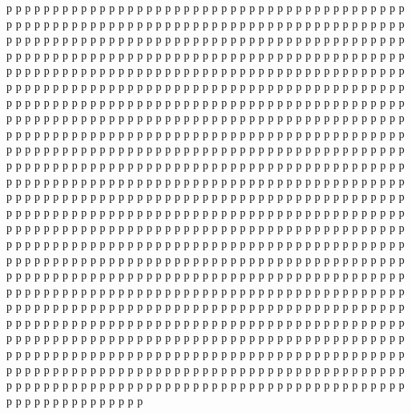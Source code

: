 \documentclass[a4paper,12pt]{article}
\begin{document}
\large
р р р р р р р р р р р р р р р р р р р р р р р р р р р р р р р р р р р р р р р р р р р р р р р р р р р р р р р р р р р р р р р р р р р р р р р р р р р р р р р р р р р р р р р р р р р р р р р р р р р р р р р р р р р р р р р р р р р р р р р р р р р р р р р р р р р р р р р р р р р р р р р р р р р р р р р р р р р р р р р р р р р р р р р р р р р р р р р р р р р р р р р р р р р р р р р р р р р р р р р р р р р р р р р р р р р р р р р р р р р р р р р р р р р р р р р р р р р р р р р р р р р р р р р р р р р р р р р р р р р р р р р р р р р р р р р р р р р р р р р р р р р р р р р р р р р р р р р р р р р р р р р р р р р р р р р р р р р р р р р р р р р р р р р р р р р р р р р р р р р р р р р р р р р р р р р р р р р р р р р р р р р р р р р р р р р р р р р р р р р р р р р р р р р р р р р р р р р р р р р р р р р р р р р р р р р р р р р р р р р р р р р р р р р р р р р р р р р р р р р р р р р р р р р р р р р р р р р р р р р р р р р р р р р р р р р р р р р р р р р р р р р р р р р р р р р р р р р р р р р р р р р р р р р р р р р р р р р р р р р р р р р р р р р р р р р р р р р р р р р р р р р р р р р р р р р р р р р р р р р р р р р р р р р р р р р р р р р р р р р р р р р р р р р р р р р р р р р р р р р р р р р р р р р р р р р р р р р р р р р р р р р р р р р р р р р р р р р р р р р р р р р р р р р р р р р р р р р р р р р р р р р р р р р р р р р р р р р р р р р р р р р р р р р р р р р р р р р р р р р р р р р р р р р р р р р р р р р р р р р р р р р р р р р р р р р р р р р р р р р р р р р р р р р р р р р р р р р р р р р р р р р р р р р р р р р р р р р р р р р р р р р р р р р р р р р р р р р р р р р р р р р р р р р р р р р р р р р р р р р р р р р р р р р р р р р р р р р р р р р р р р р р р р р р р р р р р р р р р р р р р р р р р р р р р р р р р р р р р р р р р р р р р р р р р р р р р р р р р р р р р р р р р р р р р р р р р р р р р р р р р р р р р р р р р р р р р р р р р р р р р р р р р р р р р р р р р р р р р р р р р р р р р р р р р р р р р р р р р р р р р р р р р р р р р р р р р р р р р р р р р р р р р р р р р р р р р р р р р р р р р р р р р р р р р р р р р р р р р р р р р р р р р р р р р р р р р р р р р р р р р р р р р р р р р р р р р р р р р р р р р р р р р р р р р р 
\end{document}
